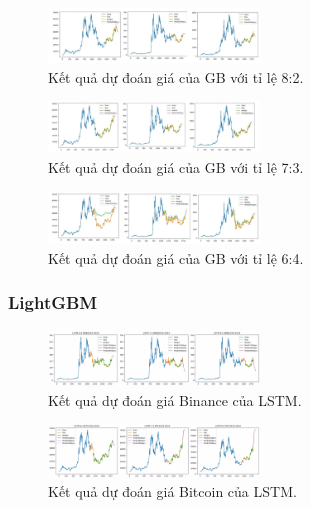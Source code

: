 \documentclass[conference]{IEEEtran}
\begin{document}
\begin{figure}[H]
    \centering
    \includegraphics[width=0.5\textwidth]{bibliography/pictures/GB_82.jpg}
    \caption{Kết quả dự đoán giá của GB với tỉ lệ 8:2.}
\end{figure}
\begin{figure}[H]
    \centering
    \includegraphics[width=0.5\textwidth]{bibliography/pictures/GB_73.jpg}
    \caption{Kết quả dự đoán giá của GB với tỉ lệ 7:3.}
\end{figure}
\begin{figure}[H]
    \centering
    \includegraphics[width=0.5\textwidth]{bibliography/pictures/GB_64.jpg}
    \caption{Kết quả dự đoán giá của GB với tỉ lệ 6:4.}
\end{figure}



\subsubsection{LightGBM}

\begin{figure}[H]
    \centering
    \includegraphics[width=0.5\textwidth]{bibliography/pictures/LSTM BNB.jpg}
    \caption{Kết quả dự đoán giá Binance của LSTM.}
\end{figure}

\begin{figure}[H]
    \centering
    \includegraphics[width=0.5\textwidth]{bibliography/pictures/LSTM BTC.jpg}
    \caption{Kết quả dự đoán giá Bitcoin của LSTM.}
\end{figure}
\end{document}
